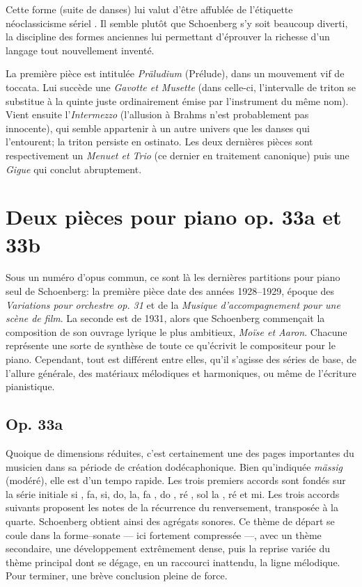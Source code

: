 \documentclass[11pt,a4paper]{scrreprt}
\begin{document}
Cette forme (suite de danses) lui valut d'être affublée de l'étiquette \og{} néoclassicisme sériel \fg{}. Il semble plutôt que Schoenberg s'y soit beaucoup diverti, la discipline des formes anciennes lui permettant d'éprouver la richesse d'un langage tout nouvellement inventé.

La première pièce est intitulée \emph{Präludium} (Prélude), dans un mouvement vif de toccata. Lui succède une \emph{Gavotte et Musette} (dans celle-ci, l'intervalle de triton se substitue à la quinte juste ordinairement émise par l'instrument du même nom). Vient ensuite l'\emph{Intermezzo} (l'allusion à Brahms n'est probablement pas innocente), qui semble appartenir à un autre univers que les danses qui l'entourent; la triton persiste en ostinato. Les deux dernières pièces sont respectivement un \emph{Menuet et Trio} (ce dernier en traitement canonique) puis une \emph{Gigue} qui conclut abruptement.


\section{Deux pièces pour piano op. 33a et 33b }
Sous un numéro d'opus commun, ce sont là les dernières partitions pour piano seul de Schoenberg: la première pièce date des années 1928--1929, époque des \emph{Variations pour orchestre op. 31} et de la \emph{Musique d'accompagnement pour une scène de film}. La seconde est de 1931, alors que Schoenberg commençait la composition de son ouvrage lyrique le plus ambitieux, \emph{Moïse et Aaron}. Chacune représente une sorte de synthèse de toute ce qu'écrivit le compositeur pour le piano. Cependant, tout est différent entre elles, qu'il s'agisse des séries de base, de l'allure générale, des matériaux mélodiques et harmoniques, ou même de l'écriture pianistique.
\subsection{Op. 33a}
Quoique de dimensions réduites, c'est certainement une des pages importantes du musicien dans sa période de création dodécaphonique. Bien qu'indiquée \emph{mässig} (modéré), elle est d'un tempo rapide. Les trois premiers accords sont fondés sur la série initiale si \fetaflat{}, fa, si, do, la, fa \fetasharp{}, do \fetasharp{}, ré \fetasharp{}, sol la \fetaflat{}, ré et mi. Les trois accords suivants proposent les notes de la récurrence du renversement, transposée à la quarte. Schoenberg obtient ainsi des agrégats sonores. Ce thème de départ se coule dans la forme--sonate --- ici fortement compressée ---, avec un thème secondaire, une développement extrêmement dense, puis la reprise variée du thème principal dont se dégage, en un raccourci inattendu, la ligne mélodique. Pour terminer, une brève conclusion pleine de force.
\end{document}
